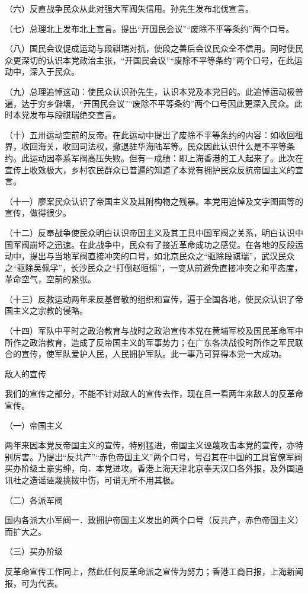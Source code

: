（六）反直战争民众从此对强大军阀失信用。孙先生发布北伐宣言。

（七）总理北上发布北上宣言。提出“开国民会议”“废除不平等条约”两个口号。

（八）国民会议促成运动与段祺瑞对抗，使段之善后会议民众全不信用。同时使民众更深切的认识本党政治主张，“开国民会议”“废除不平等条约”两个口号，在此运动中，深入于民众。

（九）总理追悼这动：使民众认识孙先生，认识本党及本党目的。此追悼运动极普遍，达于穷乡僻壤，“开国民会议”“废除不平等条约”两个口号因此更深入民众。此时本党发布与段祺瑞绝交宣言。

（十）五卅运动空前的反帝。在此运动中提出了废除不平等条约的内容：如收回租界，收回海关，收回司法权，撤退驻华海陆军等。民众因此认识什么是不平等条约。此运动因奉系军阀高压失败。但有一成绩：即上海香港的工人起来了。此次在宣传上收效极大，乡村农民群众已普遍的知道了本党有拥护民众反抗帝国主义的宣言。

（十一）廖案民众认识了帝国主义及其附构物之残暴。本党用追悼及文字图画等的宣传，做得很少。

（十二）反奉战争使民众明白认识帝国主义及其工具中国军阀之关系，明白认识中国军阀崩坏之迅速。在此战争中，民众有了接近革命成功之感觉。在各地的反段运动中，提出与当地军阀直接冲突的口号，如北京民众之“驱除段祺瑞”，武汉民众之“驱除吴佩孚”，长沙民众之“打倒赵晅惕”，一变从前避免直接冲突之和平态度，革命空气，空前的紧张。

（十三）反教运动两年来反基督敬的组织和宣传，遍于全国各地，使民众认识了帝国主义之宗教的侵略。

（十四）军队中平时之政治教育与战时之政治宣传本党在黄埔军校及国民革命军中所作之政治教育，造成了反帝国主义的军事势力；在广东各决战役时所作之军民联合的宣传，使军队爱护人民，人民拥护军队。此一事乃可算得本党一大成功。

敌人的宣传

我们的宣传之部分，不能不针对敌人的宣传去作，现在且一看两年来敌人的反革命宣传。

（一）帝国主义

两年来因本党反帝国主义的宣传，特别猛进，帝国主义诬蔑攻击本党的宣传，亦特别厉害。乃提出“反共产”“赤色帝国主义”两个口号，号召其在中国的工具官僚军阀买办阶级土豪劣绅，向．本党进攻。香港上海天津北京奉天汉口各外报，及外国通讯社之造谣诬蔑挑拨中伤，可诮无所不用其极。

（二）各派军阀

国内各派大小军阀一．致拥护帝国主义发出的两个口号（反共产，赤色帝国主义）而扩大之。

（三）买办阶级

反革命宣传工作同上，然此任何反革命派之宣传为努力；香港工商日报，上海新闻报，可为代表。

